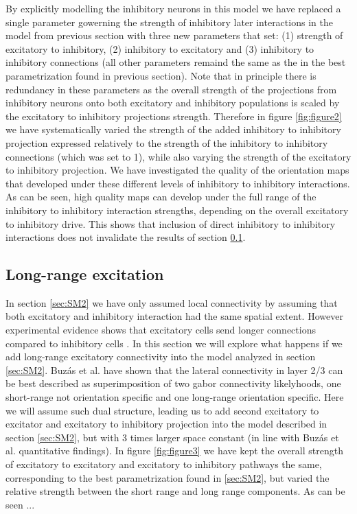 \documentclass[a4paper,10pt]{article}
\begin{document}
By explicitly modelling the inhibitory neurons in this model we have replaced a single parameter gowerning the strength of inhibitory
later interactions in the model from previous section with three new parameters that set: (1) strength of excitatory to inhibitory,
(2) inhibitory to excitatory and (3) inhibitory to inhibitory connections (all other parameters remaind the same as the 
in the best parametrization found in previous section). Note that in principle there is redundancy in these parameters as
the overall strength of the projections from inhibitory neurons onto both excitatory and inhibitory populations is scaled by the 
excitatory to inhibitory projections strength. Therefore in figure \ref{fig:figure2} we have systematically varied the strength of the added inhibitory to inhibitory
projection expressed relatively to the strength of the inhibitory to inhibitory connections (which was set to 1), while also varying the 
strength of the excitatory to inhibitory projection. We have  investigated the quality of the orientation 
maps that developed under these different levels of inhibitory to inhibitory interactions. As can be seen, high quality maps 
can develop under the full range of the inhibitory to inhibitory interaction strengths, depending on the overall 
excitatory to inhibitory drive. This shows that inclusion of direct inhibitory to inhibitory interactions does not 
invalidate the results of section \ref{sec:SM3}.

\subsection{Long-range excitation} \label{sec:SM3}

In section \ref{sec:SM2} we have only assumed local connectivity by assuming that both excitatory and inhibitory interaction had the same spatial extent. 
However experimental evidence shows that excitatory cells send longer connections compared to inhibitory cells \cite{?}. In this section we will
explore what happens if we add long-range excitatory connectivity into the model analyzed in section \ref{sec:SM2}. Buz\'as et al. \cite{Buzas2006} have
shown that the lateral connectivity in layer 2/3 can be best described as superimposition of two gabor connectivity likelyhoods, one short-range not orientation specific and one long-range orientation specific. Here we will assume such dual structure, leading us to add second excitatory to excitator and excitatory to inhibitory projection into the model described in section \ref{sec:SM2}, but with 3 times larger space constant (in line with Buz\'as et al. quantitative findings). In figure \ref{fig:figure3} we have  kept the overall strength of excitatory to excitatory and excitatory to inhibitory pathways the same, corresponding to the best parametrization found in \ref{sec:SM2}, but varied the relative strength between the short range and long range components. As can be seen ...
\end{document}
